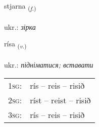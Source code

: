 \documentclass[frontgrid, backgrid]{flacards}\usepackage[]{graphicx}\usepackage[]{xcolor}
\begin{document}
\renewcommand{\flhead}{\vskip5pt \fboxsep=0pt {\small\bfseries\footnotesize Nafnorð | іменник}}
\renewcommand{\fcfoot}{\vskip5pt \fboxsep=0pt \hspace{2pt}{\small\bfseries\footnotesize 2K}}

\renewcommand{\blhead}{\vskip5pt {\small\bfseries\footnotesize Nafnorð | іменник }}
\renewcommand{\bcfoot}{\vskip5pt \hspace{2pt}{\small\bfseries\footnotesize 2K}}


{stjarna \small{\textsubscript{(\textit{f.})}} \\[1ex] %
\textphonetic{[stjartna]} \\
ukr.: \emph{зірка} \\  [2ex]
\renewcommand*{\arraystretch}{0.8}
}

\renewcommand{\flhead}{\vskip5pt \fboxsep=0pt {\small\bfseries\footnotesize Sagnorð | дієслово}}
\renewcommand{\fcfoot}{\vskip5pt \fboxsep=0pt \hspace{2pt}{\small\bfseries\footnotesize 2K}}

\renewcommand{\blhead}{\vskip5pt {\small\bfseries\footnotesize Sagnorð | дієслово }}
\renewcommand{\bcfoot}{\vskip5pt \hspace{2pt}{\small\bfseries\footnotesize 2K}}


{rísa \small{\textsubscript{(\textit{v.})}} \\[1ex] %
\textphonetic{[riːsa]} \\
ukr.: \emph{підніматися; вставати} \\  [2ex]
\renewcommand*{\arraystretch}{0.8}
\begin{tabular}{p{1cm}l}
\textsc{1sg}: & rís -- reis -- risið \\ 
\textsc{2sg}: & ríst -- reist -- risið \\ 
\textsc{3sg}: & rís -- reis -- risið \\ 
\end{tabular}
}
\end{document}
